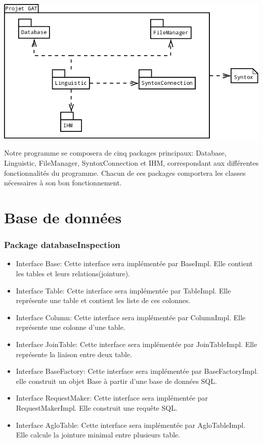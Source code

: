 \documentclass[12pt]{report}
\begin{document}
\begin{center}
\includegraphics[scale=0.45]{DiagPackages.png}
\end{center}


Notre programme se composera de cinq packages principaux: Database, Linguistic, FileManager, SyntoxConnection et IHM, correspondant aux différentes fonctionnalités du programme.
Chacun de ces packages comportera les classes nécessaires à son bon fonctionnement.






\section{Base de données}

\subsubsection*{Package databaseInspection}

\begin{itemize}
\item Interface Base: Cette interface sera implémentée par BaseImpl. Elle contient les tables et leurs relations(jointure).
\item Interface Table: Cette interface sera implémentée par TableImpl. Elle représente une table et contient les liste de ces colonnes.
\item Interface Column: Cette interface sera implémentée par ColumnImpl. Elle représente une colonne d'une table.
\item Interface JoinTable: Cette interface sera implémentée par JoinTableImpl. Elle représente la liaison entre deux table.
\item Interface BaseFactory: Cette interface sera implémentée par BaseFactoryImpl. elle construit un objet Base à partir d'une base de données SQL.
\item Interface RequestMaker: Cette interface sera implémentée par RequestMakerImpl. Elle construit une requête SQL.
\item Interface AgloTable: Cette interface sera implémentée par AgloTableImpl. Elle calcule la jointure minimal entre plusieurs table.
\end{itemize}
\end{document}
